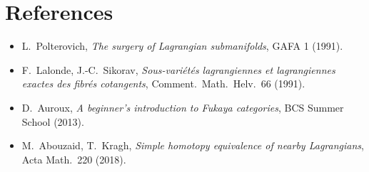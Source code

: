 \section*{References}
\begin{itemize}\setlength\itemsep{0.2em}
\item L.~Polterovich, \emph{The surgery of Lagrangian submanifolds}, GAFA 1 (1991).
\item F.~Lalonde, J.-C.~Sikorav, \emph{Sous-variétés lagrangiennes et lagrangiennes exactes des fibrés cotangents}, Comment.\ Math.\ Helv.\ 66 (1991).
\item D.~Auroux, \emph{A beginner's introduction to Fukaya categories}, BCS Summer School (2013).
\item M.~Abouzaid, T.~Kragh, \emph{Simple homotopy equivalence of nearby Lagrangians}, Acta Math.\ 220 (2018).
\end{itemize}


